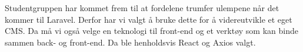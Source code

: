 Studentgruppen har kommet frem til at fordelene trumfer ulempene når det kommer til Laravel. Derfor har vi valgt å bruke dette for å videreutvikle et eget CMS. Da må vi også velge en teknologi til front-end og et verktøy som kan binde sammen back- og front-end. Da ble henholdsvis React og Axios valgt. 
\begin{compactdesc}

\end{compactdesc}
